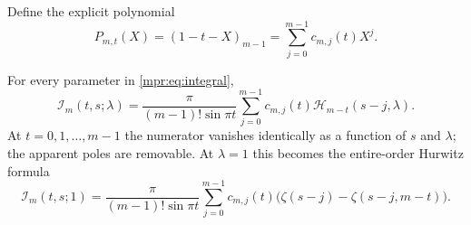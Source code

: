 Define the explicit polynomial
\begin{equation}\label{mpr:eq:P}
 P_{m,t}(X)=(1-t-X)_{m-1}
           =\sum_{j=0}^{m-1}c_{m,j}(t)X^j.
\end{equation}

\begin{theorem}\label{mpr:thm:master}
For every parameter in \eqref{mpr:eq:integral},
\begin{equation}\label{mpr:eq:master}
 \boxed{\displaystyle
 \mathcal I_m(t,s;\lambda)
 =\frac{\pi}{(m-1)!\sin\pi t}
       \sum_{j=0}^{m-1}c_{m,j}(t)
                  \mathcal H_{m-t}(s-j,\lambda).}
\end{equation}
At $t=0,1,\ldots,m-1$ the numerator vanishes identically as a function
of $s$ and $\lambda$; the apparent poles are removable.  At $\lambda=1$
this becomes the entire-order Hurwitz formula
\begin{equation}\label{mpr:eq:hurwitz}
 \mathcal I_m(t,s;1)
 =\frac{\pi}{(m-1)!\sin\pi t}
       \sum_{j=0}^{m-1}c_{m,j}(t)
       \bigl(\zeta(s-j)-\zeta(s-j,m-t)\bigr).
\end{equation}
\end{theorem}

